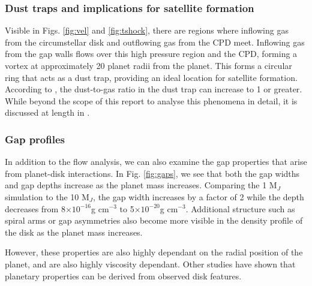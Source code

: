 \documentclass[preprint2]{aastex62}
\begin{document}
\subsubsection{Dust traps and implications for satellite formation}

Visible in Figs.  \ref{fig:vel} and \ref{fig:tshock}, there are regions where inflowing gas from the circumstellar disk and outflowing gas from the CPD meet.
Inflowing gas from the gap walls flows over this high pressure region and the CPD, forming a vortex at approximately 20 planet radii from the planet. This forms a circular ring that acts as a dust trap, providing an ideal location for satellite formation.  According to \cite{satellite}, the dust-to-gas ratio in the dust trap can increase to 1 or greater. While beyond the scope of this report to analyse this phenomena in detail, it is discussed at length in \cite{satellite}.

\subsubsection{Gap profiles}

In addition to the flow analysis, we can also examine the gap properties that arise from planet-disk interactions. 
In Fig. \ref{fig:gaps}, we see that both the gap widths and gap depths increase as the planet mass increases. Comparing the 1 M$_{J}$ simulation to the 10 M$_{J}$, the gap width increases by a factor of 2 while the depth decreases from 8$\times10^{-16}$g cm$^{-3}$ to 5$\times10^{-20}$g cm$^{-3}$. Additional structure such as spiral arms or gap asymmetries also become more visible in the density profile of the disk as the planet mass increases. 

However, these properties are also highly dependant on the radial position of the planet, and are also highly viscosity dependant. Other studies have shown that planetary properties can be derived from observed disk features.

\end{document}
